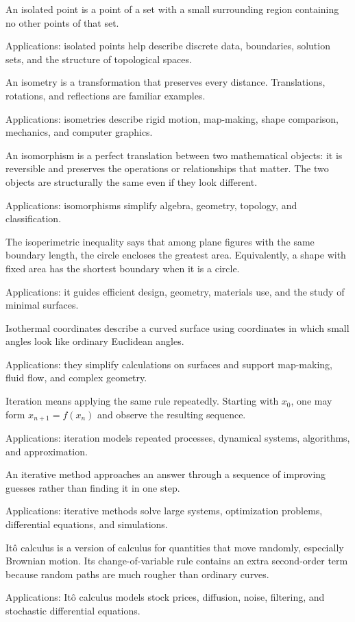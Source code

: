 An isolated point is a point of a set with a small surrounding region containing no other points of that set. \par\noindent Applications: isolated points help describe discrete data, boundaries, solution sets, and the structure of topological spaces.

An isometry is a transformation that preserves every distance. Translations, rotations, and reflections are familiar examples. \par\noindent Applications: isometries describe rigid motion, map-making, shape comparison, mechanics, and computer graphics.

An isomorphism is a perfect translation between two mathematical objects: it is reversible and preserves the operations or relationships that matter. The two objects are structurally the same even if they look different. \par\noindent Applications: isomorphisms simplify algebra, geometry, topology, and classification.

The isoperimetric inequality says that among plane figures with the same boundary length, the circle encloses the greatest area. Equivalently, a shape with fixed area has the shortest boundary when it is a circle. \par\noindent Applications: it guides efficient design, geometry, materials use, and the study of minimal surfaces.

Isothermal coordinates describe a curved surface using coordinates in which small angles look like ordinary Euclidean angles. \par\noindent Applications: they simplify calculations on surfaces and support map-making, fluid flow, and complex geometry.

Iteration means applying the same rule repeatedly. Starting with $x_0$, one may form $x_{n+1}=f(x_n)$ and observe the resulting sequence. \par\noindent Applications: iteration models repeated processes, dynamical systems, algorithms, and approximation.

An iterative method approaches an answer through a sequence of improving guesses rather than finding it in one step. \par\noindent Applications: iterative methods solve large systems, optimization problems, differential equations, and simulations.

Itô calculus is a version of calculus for quantities that move randomly, especially Brownian motion. Its change-of-variable rule contains an extra second-order term because random paths are much rougher than ordinary curves. \par\noindent Applications: Itô calculus models stock prices, diffusion, noise, filtering, and stochastic differential equations.
